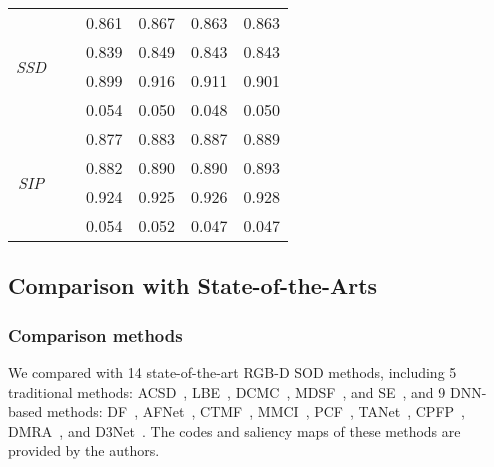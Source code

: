 \documentclass[journal]{IEEEtran}
\newcommand{\ACSD}{ACSD~\cite{ju2014depth}}
\newcommand{\SSD}{\textit{SSD}~\cite{zhu2017three}}
\newcommand{\SIP}{\textit{SIP}~\cite{fan2019D3Net}}
\begin{document}
\begin{table}[t]
\begin{tabular}{cc|cccc}
		\hline
		\multirow{4}{*}{\begin{sideways}\SSD\end{sideways}}
		&     & 0.861 & 0.867 & 0.863 & 0.863  \\
		&      & 0.839 & 0.849 & 0.843 & 0.843  \\
		&        & 0.899 & 0.916 & 0.911 & 0.901  \\
		&  & 0.054 & 0.050 & 0.048 & 0.050  \\
		\hline
		\multirow{4}{*}{\begin{sideways}\SIP\end{sideways}}
		&     & 0.877 & 0.883 & 0.887 & 0.889  \\
		&      & 0.882 & 0.890 & 0.890 & 0.893  \\
		&        & 0.924 & 0.925 & 0.926 & 0.928  \\
		&  & 0.054 & 0.052 & 0.047 & 0.047  \\
		\bottomrule
		\hline
	\end{tabular}
	\label{tab:backbone}
\end{table}

\subsection{Comparison with State-of-the-Arts}
\label{sec:SOTA}
\subsubsection{Comparison methods}
We compared with 14 state-of-the-art RGB-D SOD methods, including 5 traditional methods: \ACSD, LBE~\cite{feng2016local}, DCMC~\cite{cong2016saliency}, MDSF~\cite{song2017depth}, and SE~\cite{guo2016salient},
and 9 DNN-based methods: DF~\cite{qu2017rgbd}, AFNet~\cite{wang2019adaptive}, CTMF~\cite{han2017cnns}, MMCI~\cite{chen2019multi}, PCF~\cite{chen2018progressively}, TANet~\cite{chen2019three}, CPFP~\cite{zhao2019Contrast},  DMRA~\cite{piao2019depth}, and D3Net~\cite{fan2019D3Net}.
The codes and saliency maps of these methods are provided by the authors.
\end{document}
